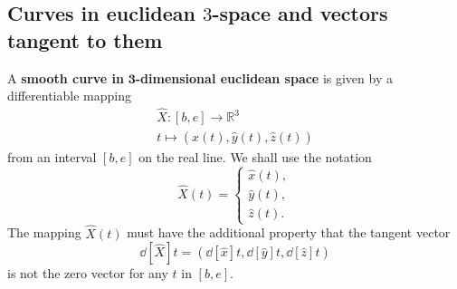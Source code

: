 \documentclass{ximera}
\begin{document}


\subsection*{Curves in euclidean $3$-space and vectors tangent to them}

\begin{definition}
A \textbf{smooth curve in }$\mathbf{3}$\textbf{-dimensional euclidean space}
is given by a differentiable mapping%
\begin{gather*}
\hat{X}:\left[  b,e\right]  \rightarrow\mathbb{R}^{3}\\
t\mapsto\left(  \hat{x}\left(  t\right)  ,\hat{y}\left(  t\right)  ,\hat
{z}\left(  t\right)  \right)
\end{gather*}
from an interval $\left[ b,e\right] $ on the real line. We shall
use the notation%
\[
\hat{X}(t) = \begin{cases}
  \hat{x}(t),\\
  \hat{y}(t),\\
  \hat{z}(t).
\end{cases}
\]
The mapping $\hat{X}(t)$ must have the additional property that
the tangent vector
\[
\dd[\hat{X}]{t} =\left(
  \dd[\hat{x}]{t},
  \dd[\hat{y}]{t},
  \dd[\hat{z}]{t}
\right)
\]
is not the zero vector for any $t$ in $[b,e]$.
\end{definition}
\end{document}
